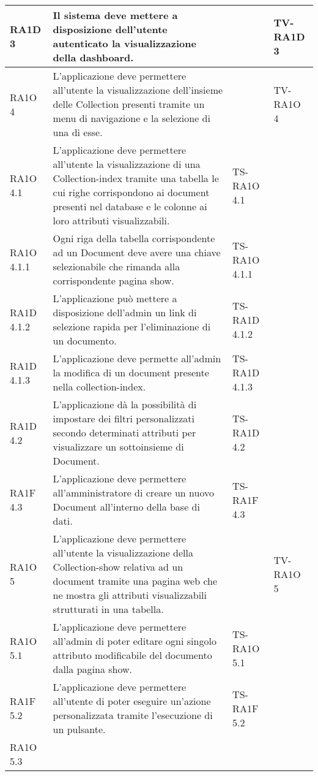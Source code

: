 \begin{center}
\begin{longtable}{| p{2cm} | p{6cm} | p{2.5cm} | p{2.5cm} | }
        RA1D 3 & 
        Il sistema deve mettere a disposizione dell'utente autenticato la visualizzazione della dashboard. &  & TV-RA1D 3 \\ \hline 
        RA1O 4 & 
        L'applicazione deve permettere all'utente la visualizzazione dell'insieme delle Collection presenti tramite un menu di navigazione e la selezione di una di esse. &  & TV-RA1O 4 \\ \hline 
        RA1O 4.1 & 
        L'applicazione deve permettere all'utente la visualizzazione di una Collection-index tramite una tabella le cui righe corrispondono ai document presenti nel database e le colonne ai loro attributi visualizzabili. & TS-RA1O 4.1 & \\ \hline 
        RA1O 4.1.1 & 
        Ogni riga della tabella corrispondente ad un Document deve avere una chiave selezionabile che rimanda alla corrispondente pagina show. & TS-RA1O 4.1.1 & \\ \hline 
        RA1D 4.1.2 & 
        L’applicazione può mettere a disposizione dell’admin un link di selezione rapida per l’eliminazione di un documento. & TS-RA1D 4.1.2 & \\ \hline 
        RA1D 4.1.3 & 
        L’applicazione deve permette all’admin la modifica di un document presente nella collection-index. & TS-RA1D 4.1.3 & \\ \hline 
        RA1D 4.2 & 
        L’applicazione dà la possibilità di impostare dei filtri personalizzati secondo determinati attributi per visualizzare un sottoinsieme di Document. & TS-RA1D 4.2 & \\ \hline 
        RA1F 4.3 & 
        L’applicazione deve permettere all’amministratore di creare un nuovo Document all’interno della base di dati. & TS-RA1F 4.3 & \\ \hline 
        RA1O 5 & 
        L'applicazione deve permettere all'utente la visualizzazione della Collection-show relativa ad un document tramite una pagina web che ne mostra gli attributi visualizzabili strutturati in una tabella. &  & TV-RA1O 5 \\ \hline 
        RA1O 5.1 & 
        L'applicazione deve permettere all'admin di poter editare ogni singolo attributo modificabile del documento dalla pagina show. & TS-RA1O 5.1 & \\ \hline 
        RA1F 5.2 & 
        L’applicazione deve permettere all’utente di poter eseguire un’azione personalizzata tramite l’esecuzione di un pulsante. & TS-RA1F 5.2 & \\ \hline 
        RA1O 5.3 & 

\end{longtable}
\end{center}
